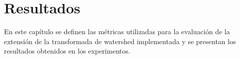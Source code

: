\chapter{Resultados}
\label{chap:resultados}

En este capítulo se definen las métricas utilizadas para la evaluación de la extensión de la transformada de watershed implementada y se presentan los resultados obtenidos en los experimentos.





